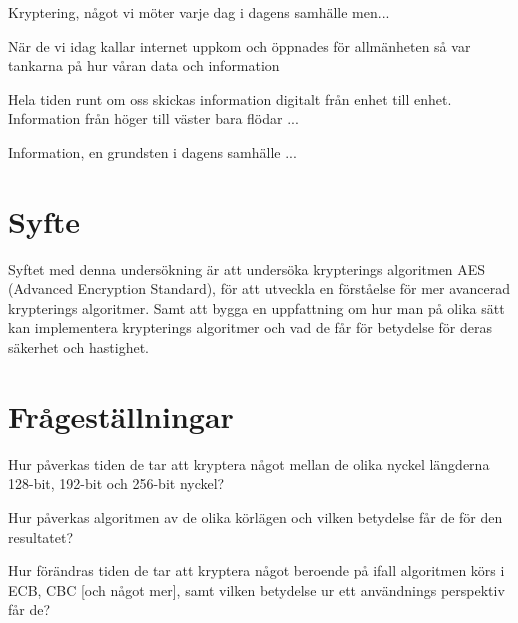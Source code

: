 
Kryptering, något vi möter varje dag i dagens samhälle men...

När de vi idag kallar internet uppkom och öppnades för allmänheten så var tankarna på hur
våran data och information

Hela tiden runt om oss skickas information digitalt från enhet till enhet. Information från
höger till väster bara flödar ...

Information, en grundsten i dagens samhälle ...

\section{Syfte} %
Syftet med denna undersökning är att undersöka krypterings algoritmen AES
(Advanced Encryption Standard), för att utveckla en förståelse för mer
avancerad krypterings algoritmer. Samt att bygga en uppfattning om hur
man på olika sätt kan implementera krypterings algoritmer och vad de får
för betydelse för deras säkerhet och hastighet.

\section{Frågeställningar} %
Hur påverkas tiden de tar att kryptera något mellan de olika nyckel längderna 128-bit,
192-bit och 256-bit nyckel?

Hur påverkas algoritmen av de olika körlägen och vilken betydelse får de för den resultatet?

Hur förändras tiden de tar att kryptera något beroende på ifall algoritmen körs i ECB, CBC
[och något mer], samt vilken betydelse ur ett användnings perspektiv får de?

